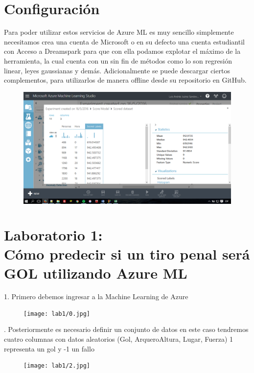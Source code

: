 \documentclass[11pt]{article}
\begin{document}
\section{Configuración}

Para poder utilizar estos servicios de Azure ML es muy sencillo simplemente necesitamos crea una cuenta de Microsoft o en su defecto una cuenta estudiantil con Acceso a Dreamspark para que con ella podamos explotar el máximo de la herramienta, la cual cuenta con un sin fin de métodos como lo son regresión linear, leyes gaussianas y demás. Adicionalmente se puede descargar ciertos complementos, para utilizarlos de manera offline desde su repositorio en GitHub.


\begin{figure}[htp]
\centering
\includegraphics[width=12cm]{8.jpg}
\label{fig:lion}
\end{figure}

\newpage
\section {Laboratorio 1: \\  Cómo predecir si un tiro penal será GOL utilizando Azure ML}

1. Primero debemos ingresar a la Machine Learning de Azure

\begin{figure}[htp]
\centering
\texttt{[image: lab1/0.jpg]}
\label{fig:lion}
\end{figure}

. Posteriormente es necesario definir un conjunto de datos en este caso tendremos cuatro columnas con datos aleatorios (Gol, ArqueroAltura, Lugar, Fuerza)
1 representa un gol y -1 un fallo\\

\begin{figure}[htp]
\centering
\texttt{[image: lab1/2.jpg]}
\label{fig:lion}
\end{figure}
\end{document}
